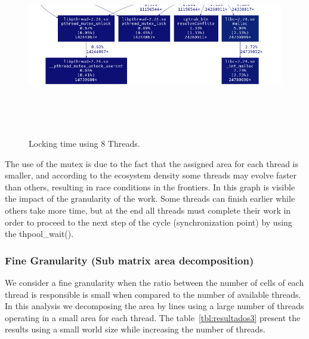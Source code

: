 \documentclass[10pt,a4paper,final]{report}
\begin{document}
\begin{figure}[H]
      \centering
      \includegraphics[height=8cm,width=12cm]{sub_grafico_mp1_8_200x200_Lock.png}
	        
      \caption{Locking time using 8 Threads.}
      \label{fig_lock_8}
\end{figure}


The use of the mutex is due to the fact that the assigned area for each thread is smaller, and according to the ecosystem density some threads may evolve faster than others, resulting in race conditions in the frontiers. In this graph is visible the impact of the granularity of the work. Some threads can finish earlier while others take more time, but at the end all threads must complete their work in order to proceed to the next step of the cycle (synchronization point) by using the thpool\_wait().


\subsubsection{Fine Granularity (Sub matrix area decomposition)}

We consider a fine granularity when the ratio between the number of cells of each thread is responsible is small when compared to the number of available threads. In this analysis we decomposing the area  by lines using a large number of threads operating in a small area for each thread. The table~\ref{tbl:resultados3} present the results using a small world size while increasing the number of threads. 
\end{document}
